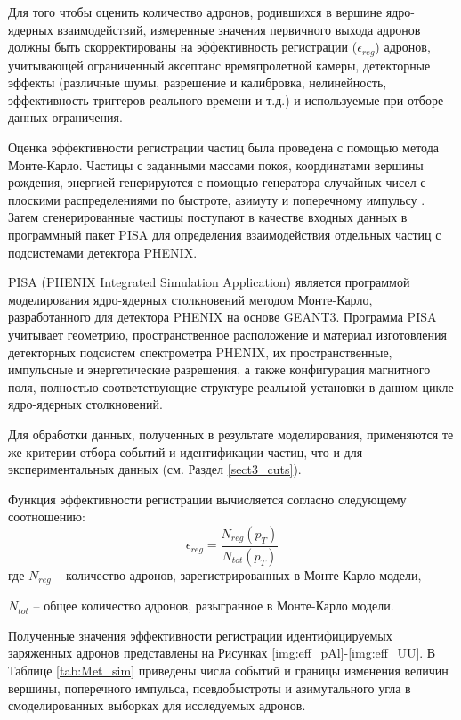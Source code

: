 Для того чтобы оценить количество адронов, родившихся в вершине ядро-ядерных взаимодействий, измеренные значения первичного выхода адронов должны быть скорректированы на эффективность регистрации ($\epsilon_{reg}$) адронов, учитывающей ограниченный аксептанс времяпролетной камеры, детекторные эффекты (различные шумы, разрешение и калибровка, нелинейность, эффективность триггеров реального времени и т.д.) и используемые при отборе данных ограничения.

Оценка эффективности регистрации частиц была проведена с помощью метода Монте-Карло.
Частицы с заданными массами покоя, координатами вершины рождения, энергией генерируются с помощью генератора  случайных чисел с плоскими распределениями по быстроте, азимуту и поперечному импульсу \pt. Затем сгенерированные частицы поступают в качестве входных данных в программный пакет PISA для определения взаимодействия отдельных частиц с подсистемами детектора PHENIX. 

PISA (PHENIX Integrated Simulation Application) является программой моделирования ядро-ядерных столкновений методом Монте-Карло, разработанного для детектора PHENIX на основе GEANT3.
Программа PISA учитывает геометрию, пространственное расположение и материал изготовления детекторных подсистем спектрометра PHENIX, их пространственные, импульсные и энергетические разрешения, а также конфигурация магнитного поля, полностью соответствующие структуре реальной установки в данном цикле ядро-ядерных столкновений.

Для обработки данных, полученных в результате моделирования, применяются те же критерии отбора событий и идентификации частиц, что и для экспериментальных данных (см. Раздел \ref{sect3_cuts}).

Функция эффективности регистрации вычисляется согласно следующему соотношению:
$$\epsilon_{reg} = \frac{N_{reg}(p_T)}{N_{tot}(p_T)}$$
где $N_{reg}$ -- количество адронов, зарегистрированных в Монте-Карло модели,

$N_{tot}$ -- общее количество адронов, разыгранное в Монте-Карло модели.

Полученные значения эффективности регистрации идентифицируемых заряженных адронов представлены на Рисунках \ref{img:eff_pAl}-\ref{img:eff_UU}.
В Таблице \ref{tab:Met_sim} приведены числа событий и границы изменения величин вершины, поперечного импульса, псевдобыстроты и азимутального угла в смоделированных выборках для исследуемых адронов.

